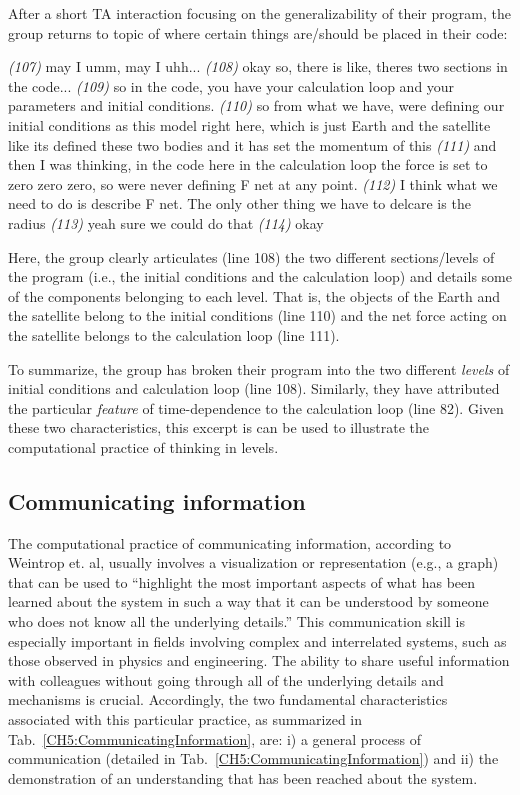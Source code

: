 \documentclass{msuphddissertation}
\begin{document}
\begin{doublespace}
After a short TA interaction focusing on the generalizability of their program, the group returns to topic of where certain things are/should be placed in their code: \begin{description}
\SB \textit{(107)} may I umm, may I uhh...
\SB \textit{(108)} okay so, there is like, theres two sections in the code...   
\SB \textit{(109)} so in the code, you have your calculation loop and your parameters and initial conditions.  
\SB \textit{(110)} so from what we have, were defining our initial conditions as this model right here, which is just Earth and the satellite like its defined these two bodies and it has set the momentum of this    
\SB \textit{(111)} and then I was thinking, in the code here {in the calculation loop} the force is set to zero zero zero, so were never defining F net at any point.
\SB \textit{(112)} I think what we need to do is describe F net. The only other thing we have to delcare is the radius    
\SC \textit{(113)} yeah sure we could do that  
\SD \textit{(114)} okay
\end{description}  Here, the group clearly articulates (line 108) the two different sections/levels of the program (i.e., the initial conditions and the calculation loop) and details some of the components belonging to each level.  That is, the objects of the Earth and the satellite belong to the initial conditions (line 110) and the net force acting on the satellite belongs to the calculation loop (line 111).

To summarize, the group has broken their program into the two different \textit{levels} of initial conditions and calculation loop (line 108).  Similarly, they have attributed the particular \textit{feature} of time-dependence to the calculation loop (line 82).  Given these two characteristics, this excerpt is can be used to illustrate the computational practice of thinking in levels.

\subsection{Communicating information}\label{CH5:SecCommunicatingInformation}

The computational practice of communicating information, according to Weintrop et. al, usually involves a visualization or representation (e.g., a graph) that can be used to ``highlight the most important aspects of what has been learned about the system in such a way that it can be understood by someone who does not know all the underlying details.''  This communication skill is especially important in fields involving complex and interrelated systems, such as those observed in physics and engineering.  The ability to share useful information with colleagues without going through all of the underlying details and mechanisms is crucial.  Accordingly, the two fundamental characteristics associated with this particular practice, as summarized in Tab.~\ref{CH5:CommunicatingInformation}, are: i) a general process of communication (detailed in Tab.~\ref{CH5:CommunicatingInformation}) and ii) the demonstration of an understanding that has been reached about the system.


\end{doublespace}
\end{document}
